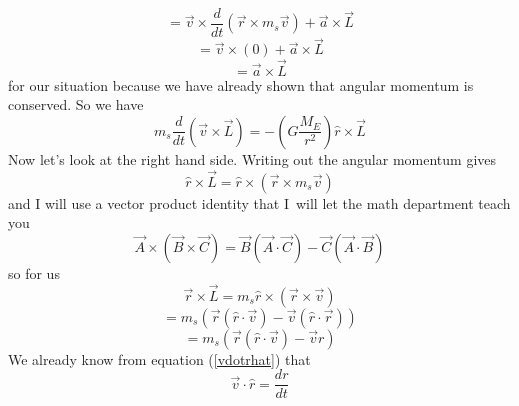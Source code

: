 \begin{equation*}
	=\overrightarrow{v}\times \frac{d}{dt}\left( \overrightarrow{r}\times m_{s}%
	\overrightarrow{v}\right) +\overrightarrow{a}\times \overrightarrow{L}
\end{equation*}
\begin{equation*}
	=\overrightarrow{v}\times \left( 0\right) +\overrightarrow{a}\times 
	\overrightarrow{L}
\end{equation*}
\begin{equation*}
	=\overrightarrow{a}\times \overrightarrow{L}
\end{equation*}
for our situation because we have already shown that angular momentum is
conserved. So we have
\begin{equation*}
	m_{s}\frac{d}{dt}\left( \overrightarrow{v}\times \overrightarrow{L}%
	\right)=-\left( G\frac{M_{E}}{r^{2}}\right) \hat{r}\times \overrightarrow{L}
\end{equation*}
Now let's look at the right hand side. Writing out the angular momentum gives
\begin{equation*}
	\hat{r}\times \overrightarrow{L}=\hat{r}\times \left( \overrightarrow{r}%
	\times m_{s}\overrightarrow{v}\right) 
\end{equation*}
and I will use a vector product identity that I\ will let the math department teach you
\begin{equation*}
	\overrightarrow{A}\times \left( \overrightarrow{B}\times \overrightarrow{C}%
	\right) =\overrightarrow{B}\left( \overrightarrow{A}\cdot \overrightarrow{C}%
	\right) -\overrightarrow{C}\left( \overrightarrow{A}\cdot \overrightarrow{B}%
	\right) 
\end{equation*}%
so for us
\begin{equation*}
	\overrightarrow{r}\times \overrightarrow{L}=m_{s}\hat{r}\times \left( 
	\overrightarrow{r}\times \overrightarrow{v}\right) 
\end{equation*}%
\begin{equation*}
	=m_{s}\left( \overrightarrow{r}\left( \hat{r}\cdot \overrightarrow{v}\right)
	-\overrightarrow{v}\left( \hat{r}\cdot \overrightarrow{r}\right) \right) 
\end{equation*}%
\begin{equation*}
	=m_{s}\left( \overrightarrow{r}\left( \hat{r}\cdot \overrightarrow{v}\right)
	-\overrightarrow{v}r\right) 
\end{equation*}%
We already know from equation (\ref{vdotrhat}) that%
\begin{equation*}
	\overrightarrow{v}\cdot \hat{r}=\frac{dr}{dt}
\end{equation*}%
